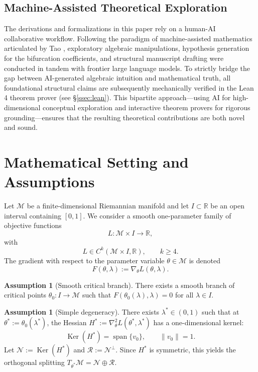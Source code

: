 \documentclass[11pt, reqno]{amsart}
\theoremstyle{plain}
\theoremstyle{definition}
\newtheorem{assumption}[theorem]{Assumption}
\theoremstyle{remark}
\DeclareMathOperator{\spanop}{span}
\DeclareMathOperator{\Ker}{Ker}
\begin{document}
\subsection{Machine-Assisted Theoretical Exploration}
The derivations and formalizations in this paper rely on a human-AI collaborative workflow. Following the paradigm of machine-assisted mathematics articulated by Tao \cite{tao2026}, exploratory algebraic manipulations, hypothesis generation for the bifurcation coefficients, and structural manuscript drafting were conducted in tandem with frontier large language models. To strictly bridge the gap between AI-generated algebraic intuition and mathematical truth, all foundational structural claims are subsequently mechanically verified in the Lean 4 theorem prover (see \S\ref{ssec:lean}). This bipartite approach---using AI for high-dimensional conceptual exploration and interactive theorem provers for rigorous grounding---ensures that the resulting theoretical contributions are both novel and sound.

\section{Mathematical Setting and Assumptions}\label{sec:setting}

Let $\mathcal M$ be a finite-dimensional Riemannian manifold and let $I\subset \mathbb R$ be an open interval containing $[0,1]$. We consider a smooth one-parameter family of objective functions
\begin{equation}
  L:\mathcal M\times I\to \mathbb R,
\end{equation}
with
\begin{equation}
  L\in C^k(\mathcal M\times I,\mathbb R), \qquad k\ge 4.
\end{equation}
The gradient with respect to the parameter variable $\theta\in\mathcal M$ is denoted
\begin{equation}
  F(\theta,\lambda):=\nabla_\theta L(\theta,\lambda).
\end{equation}

\begin{assumption}[Smooth critical branch]\label{ass:smooth-branch}
There exists a smooth branch of critical points
$\theta_0:I\to \mathcal M$
such that
$F(\theta_0(\lambda),\lambda)=0$
for all $\lambda\in I$.
\end{assumption}

\begin{assumption}[Simple degeneracy]\label{ass:simple-degeneracy}
There exists $\lambda^*\in(0,1)$ such that at
$\theta^*:=\theta_0(\lambda^*)$,
the Hessian
$H^*:=\nabla^2_\theta L(\theta^*,\lambda^*)$
has a one-dimensional kernel:
\begin{equation}
  \Ker(H^*)=\spanop\{v_0\}, \qquad \|v_0\|=1.
\end{equation}
Let
$\mathcal N:=\Ker(H^*)$ and $\mathcal R:=\mathcal N^\perp$.
Since $H^*$ is symmetric, this yields the orthogonal splitting
$T_{\theta^*}\mathcal M = \mathcal N \oplus \mathcal R$.
\end{assumption}
\end{document}

